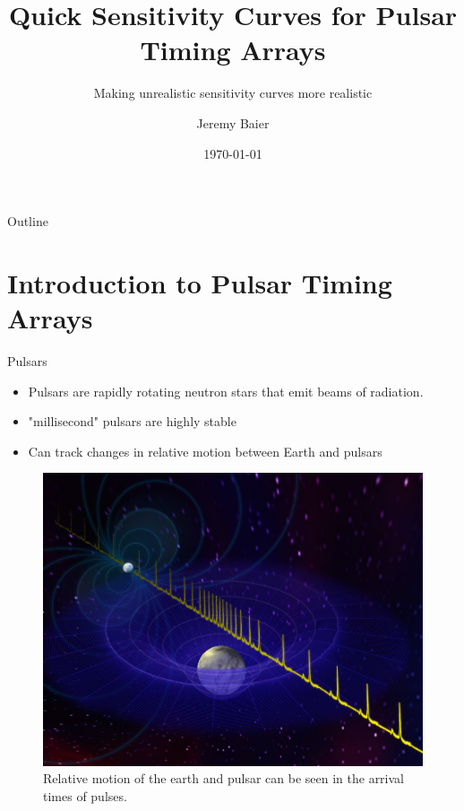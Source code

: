 \documentclass{beamer}
\title[PTA Sensitivity]{Quick Sensitivity Curves for Pulsar Timing Arrays}
\subtitle{Making unrealistic sensitivity curves more realistic}
\author[Jeremy Baier]{Jeremy Baier}
\institute[OSU]{Oregon State University}
\date{\today}
\begin{document}
\begin{frame}
    \titlepage
\end{frame}

\begin{frame}{Outline}
    \tableofcontents
\end{frame}

\section{Introduction to Pulsar Timing Arrays}
\begin{frame}{Pulsars}
    \begin{itemize}
        \item Pulsars are rapidly rotating neutron stars that emit beams of radiation.
        \item "millisecond" pulsars are highly stable
        \item Can track changes in relative motion between Earth and pulsars
    \end{itemize}
    \begin{figure}
        \centering
        \includegraphics[width=0.5\linewidth]{figs/pulsar_timing.png}
        \caption{Relative motion of the earth and pulsar can be seen in the arrival times of pulses.}
        \label{fig:pulsar}
    \end{figure}
\end{frame}
\end{document}
